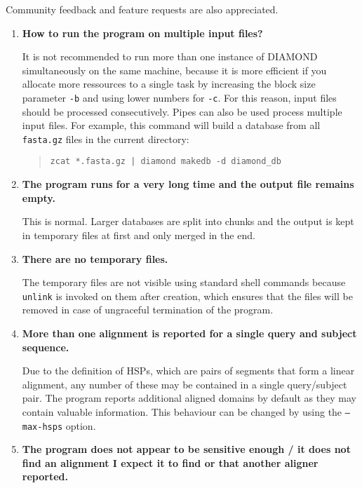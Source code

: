 \documentclass[11pt]{article}
\newenvironment{QandA}{\begin{enumerate}}
                      {\end{enumerate}}
\newenvironment{answered}{\par\normalfont}{}
\begin{document}
\noindent Community feedback and feature requests are also appreciated.
\begin{QandA}
\item \textbf{How to run the program on multiple input files?}
\begin{answered}
It is not recommended to run more than one instance of DIAMOND simultaneously on the same machine, because it is more efficient if you allocate more ressources to a single task by increasing the block size parameter \texttt{-b} and using lower numbers for \texttt{-c}. For this reason, input files should be processed consecutively. Pipes can also be used process multiple input files. For example, this command will build a database from all \texttt{fasta.gz} files in the current directory:
\begin{quote}
\texttt{zcat *.fasta.gz | diamond makedb -d diamond\_db}
\end{quote}
\end{answered}
\item \textbf{The program runs for a very long time and the output file remains empty.}
\begin{answered}
This is normal. Larger databases are split into chunks and the output is kept in temporary files at first and only merged in the end.
\end{answered}
\item \textbf{There are no temporary files.}
\begin{answered}
The temporary files are not visible using standard shell commands because \texttt{unlink} is invoked on them after creation, which ensures that the files will be removed in case of ungraceful termination of the program.
\end{answered}
\item \textbf{More than one alignment is reported for a single query and subject sequence.}
\begin{answered}
Due to the definition of HSPs, which are pairs of segments that form a linear alignment, any number of these may be contained in a single query/subject pair. The program reports additional aligned domains by default as they may contain valuable information. This behaviour can be changed by using the \texttt{--max-hsps} option.
\end{answered}
\item \textbf{The program does not appear to be sensitive enough / it does not find an alignment I expect it to find or that another aligner reported.}
\begin{answered}

\end{answered}
\end{QandA}
\end{document}
